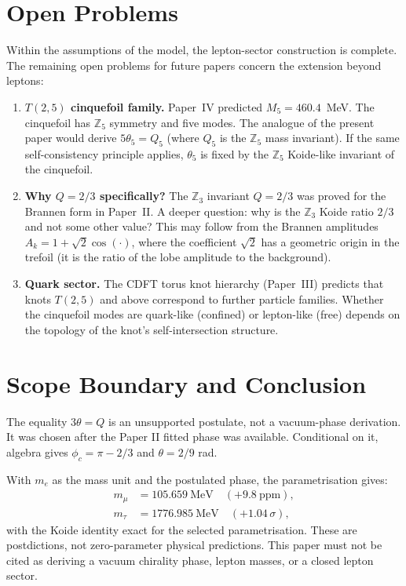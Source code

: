 \documentclass[11pt]{article}
\begin{document}
\section{Open Problems}

Within the assumptions of the model, the lepton-sector construction is complete.
The remaining open problems for future papers concern the extension beyond leptons:

\begin{enumerate}
\item \textbf{$T(2,5)$ cinquefoil family.}
  Paper~IV predicted $M_5 = 460.4$~MeV.
  The cinquefoil has $\mathbb{Z}_5$ symmetry and five modes.
  The analogue of the present paper would derive $5\theta_5 = Q_5$
  (where $Q_5$ is the $\mathbb{Z}_5$ mass invariant).
  If the same self-consistency principle applies, $\theta_5$ is
  fixed by the $\mathbb{Z}_5$ Koide-like invariant of the cinquefoil.

\item \textbf{Why $Q = 2/3$ specifically?}
  The $\mathbb{Z}_3$ invariant $Q = 2/3$ was proved for the Brannen
  form in Paper~II.
  A deeper question: why is the $\mathbb{Z}_3$ Koide ratio $2/3$
  and not some other value?
  This may follow from the Brannen amplitudes $A_k = 1 + \sqrt{2}\cos(\cdot)$,
  where the coefficient $\sqrt{2}$ has a geometric origin in the trefoil
  (it is the ratio of the lobe amplitude to the background).

\item \textbf{Quark sector.}
  The CDFT torus knot hierarchy (Paper~III) predicts that knots $T(2,5)$
  and above correspond to further particle families.
  Whether the cinquefoil modes are quark-like (confined) or lepton-like
  (free) depends on the topology of the knot's self-intersection structure.
\end{enumerate}


\section{Scope Boundary and Conclusion}

The equality $3\theta=Q$ is an unsupported postulate, not a vacuum-phase
derivation. It was chosen after the Paper II fitted phase was available.
Conditional on it, algebra gives $\phi_c=\pi-2/3$ and $\theta=2/9$ rad.

With $m_e$ as the mass unit and the postulated phase, the parametrisation gives:
\begin{align*}
  m_\mu  &= 105.659~\text{MeV} \quad (+9.8~\text{ppm}),  \\
  m_\tau &= 1776.985~\text{MeV} \quad (+1.04\,\sigma),
\end{align*}
with the Koide identity exact for the selected parametrisation. These are
postdictions, not zero-parameter physical predictions. This paper must not be
cited as deriving a vacuum chirality phase, lepton masses, or a closed lepton
sector.
\end{document}
